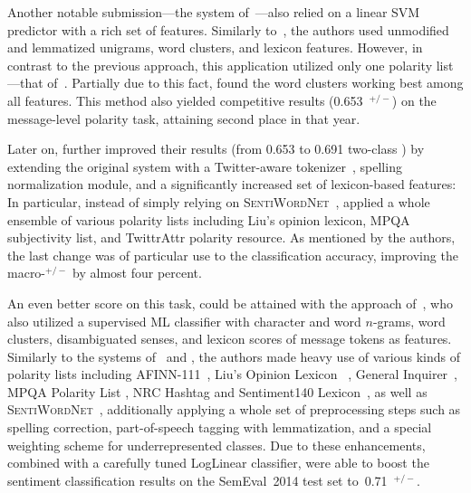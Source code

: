 Another notable submission---the system of~\citet{Guenther:13}---also
relied on a linear SVM predictor with a rich set of features.
Similarly to~\citet{Mohammad:13}, the authors used unmodified and
lemmatized unigrams, word clusters, and lexicon features.  However, in
contrast to the previous approach, this application utilized only one
polarity list---that of~\citet{Esuli:05}.  Partially due to this fact,
\citeauthor{Guenther:13} found the word clusters working best among
all features.  This method also yielded competitive results
(0.653~\F{}$^{+/-}$) on the message-level polarity task, attaining
second place in that year.

Later on, \citet{Guenther:14} further improved their results (from
0.653 to 0.691 two-class \F) by extending the original system with a
Twitter-aware tokenizer~\cite{Owoputi:13}, spelling normalization
module, and a significantly increased set of lexicon-based features:
In particular, instead of simply relying on
\textsc{SentiWordNet}~\cite{Esuli:05}, \citeauthor{Guenther:14}
applied a whole ensemble of various polarity lists including Liu's
opinion lexicon, MPQA subjectivity list, and TwittrAttr polarity
resource.  As mentioned by the authors, the last change was of
particular use to the classification accuracy, improving the
macro-\F{}$^{+/-}$ by almost four percent.

An even better score on this task, could be attained with the approach
of~\citet{Miura:14}, who also utilized a supervised ML classifier with
character and word $n$-grams, word clusters, disambiguated senses, and
lexicon scores of message tokens as features.  Similarly to the
systems of~\citet{Mohammad:13} and \citet{Guenther:14}, the authors
made heavy use of various kinds of polarity lists including
AFINN-111~\cite{Nielsen:11}, Liu's Opinion Lexicon~\cite{Hu:04} ,
General Inquirer~\cite{Stone:66}, MPQA Polarity List \cite{Wiebe:05a},
NRC Hashtag and Sentiment140 Lexicon~\cite{Mohammad:13}, as well as
\textsc{SentiWordNet}~\cite{Esuli:06a}, additionally applying a whole
set of preprocessing steps such as spelling correction, part-of-speech
tagging with lemmatization, and a special weighting scheme for
underrepresented classes.  Due to these enhancements, combined with a
carefully tuned LogLinear classifier, \citet{Miura:14} were able to
boost the sentiment classification results on the SemEval~2014 test
set to~0.71~\F{}$^{+/-}$.

